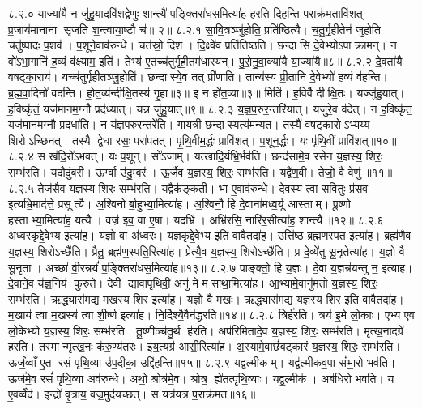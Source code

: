 ८.२.०
या॒ज्या॑यै॒ न जु॑हु॒यादवि॑श॒द्वेणुः॒ शान्त्यै॑ प॒ङ्क्तिरा॑धस॒मित्या॑ह हरति दिहन्ति प॒राक्र॑म॒तावि॑शत् प्र॒जाय॑मानाना सृजति श॒न्त्वाया॒ष्टौ च॑॥ २॥
८.२.१
सा॒वि॒त्रञ्जु॑होति॒ प्रति॑ष्ठित्यै। च॒तु॒र्गृ॒ही॒तेन॑ जुहोति। चतु॑ष्पादः प॒शव॑। प॒शूने॒वाव॑रुन्धे। चत॑स्रो॒ दिश॑। दि॒क्ष्वे॑व प्रति॑तिष्ठति। छन्दासि दे॒वेभ्योऽपाक्रामन्। न वो॑ऽभा॒गानि॑ ह॒व्यं व॑क्ष्याम॒ इति॑। तेभ्य॑ ए॒तच्च॑तुर्गृही॒तम॑धारयन्। पु॒रो॒नु॒वा॒क्या॑यै या॒ज्या॑यै॥८॥
८.२.२
दे॒वता॑यै वषट्का॒राय॑। यच्च॑तुर्गृही॒तञ्जु॒होति॑। छन्दास्ये॒व तत् प्री॑णाति। तान्य॑स्य प्री॒तानि॑ दे॒वेभ्यो॑ ह॒व्यं व॑हन्ति। ब्र॒ह्म॒वा॒दिनो॑ वदन्ति। हो॒त॒व्य॑न्दीक्षि॒तस्य॑ गृ॒हा॥३॥ इ न हो॑त॒व्या॥३॥ मिति॑। ह॒विर्वै दीक्षि॒तः। यज्जु॑हु॒यात्। ह॒विष्कृ॑तं॒ यज॑मानम॒ग्नौ प्रद॑ध्यात्। यन्न जु॑हु॒यात्॥९॥
८.२.३
य॒ज्ञ॒प॒रुर॒न्तरि॑यात्। यजु॑रे॒व व॑देत्। न ह॒विष्कृ॑तं॒ यज॑मानम॒ग्नौ प्र॒दधा॑ति। न य॑ज्ञप॒रुर॒न्तरे॑ति। गा॒य॒त्री छन्दा॒स्यत्य॑मन्यत। तस्यै॑ वषट्का॒रोऽभ्यय्य॒ शिरोऽच्छिनत्। तस्यै द्वे॒धा रसः॒ परा॑पतत्। पृ॒थि॒वीम॒र्द्धः प्रावि॑शत्। प॒शून॒र्द्धः। यः पृ॑थि॒वीं प्रावि॑शत्॥१०॥
८.२.४
स ख॑दि॒रो॑ऽभवत्। यः प॒शून्। सो॑ऽजाम्। यत्खा॑दि॒र्यभ्रि॒र्भव॑ति। छन्द॑सामे॒व रसे॑न य॒ज्ञस्य॒ शिरः॒ सम्भ॑रति। यदौदुं॑बरी। ऊर्ग्वा उ॑दु॒म्बर॑। ऊ॒र्जैव य॒ज्ञस्य॒ शिरः॒ सम्भ॑रति। यद्वै॑ण॒वी। तेजो॒ वै वेणु॑॥११॥
८.२.५
तेज॑सै॒व य॒ज्ञस्य॒ शिरः॒ सम्भ॑रति। यद्वैक॑ङ्कती। भा ए॒वाव॑रुन्धे। दे॒वस्य॑ त्वा सवि॒तुः प्र॑स॒व इत्यभ्रि॒माद॑त्ते॒ प्रसूत्यै। अ॒श्विनोर्बा॒हुभ्या॒मित्या॑ह। अ॒श्विनौ॒ हि दे॒वाना॑मध्व॒र्यू आस्ताम्। पू॒ष्णो हस्ताभ्या॒मित्या॑ह॒ यत्यै। वज्र॑ इव॒ वा ए॒षा। यदभ्रि॑। अभ्रि॑रसि॒ नारि॑र॒सीत्या॑ह॒ शान्त्यै॥१२॥
८.२.६
अ॒ध्व॒र॒कृद्दे॒वेभ्य॒ इत्या॑ह। य॒ज्ञो वा अ॑ध्व॒रः। य॒ज्ञ॒कृद्दे॒वेभ्य॒ इति॒ वावैतदा॑ह। उत्ति॑ष्ठ ब्रह्मणस्पत॒ इत्या॑ह। ब्रह्म॑णै॒व य॒ज्ञस्य॒ शिरोऽच्छै॑ति। प्रैतु॒ ब्रह्म॑ण॒स्पति॒रित्या॑ह। प्रेत्यै॒व य॒ज्ञस्य॒ शिरोऽच्छै॑ति। प्र दे॒व्ये॑तु सू॒नृतेत्या॑ह। य॒ज्ञो वै सू॒नृता। अच्छा॑ वी॒रन्नर्यं॑ प॒ङ्क्तिरा॑धस॒मित्या॑ह॥१३॥
८.२.७
पाङ्क्तो॒ हि य॒ज्ञः। दे॒वा य॒ज्ञन्न॑यन्तु न॒ इत्या॑ह। दे॒वाने॒व य॑ज्ञ॒निय॑ कुरुते। देवी द्यावापृथिवी॒ अनु॑ मे मसाथा॒मित्या॑ह। आ॒भ्यामे॒वानु॑मतो य॒ज्ञस्य॒ शिरः॒ सम्भ॑रति। ऋ॒द्ध्यास॑म॒द्य म॒खस्य॒ शिर॒ इत्या॑ह। य॒ज्ञो वै म॒खः। ऋ॒द्ध्यास॑म॒द्य य॒ज्ञस्य॒ शिर॒ इति वावैतदा॑ह। म॒खाय॑ त्वा म॒खस्य॑ त्वा शी॒र्ष्ण इत्या॑ह। नि॒र्दिश्यै॒वैन॑द्धरति॥१४॥
८.२.८
त्रिर्\mbox{}ह॑रति। त्रय॑ इ॒मे लो॒काः। ए॒भ्य ए॒व लो॒केभ्यो॑ य॒ज्ञस्य॒ शिरः॒ सम्भ॑रति। तू॒ष्णीञ्च॑तु॒र्थ ह॑रति। अप॑रिमितादे॒व य॒ज्ञस्य॒ शिरः॒ सम्भ॑रति। मृ॒त्ख॒नादग्रे॑ हरति। तस्मान्मृत्ख॒नः क॑रु॒ण्य॑तरः। इय॒त्यग्र॑ आसी॒रित्या॑ह। अ॒स्यामे॒वाछं॑बट्कारं य॒ज्ञस्य॒ शिरः॒ सम्भ॑रति। ऊर्जं॒व्वाँ ए॒त रसं॑ पृथि॒व्या उ॑प॒दीका॒ उद्दि॑हन्ति॥१५॥
८.२.९
यद्व॒ल्मीकम्। यद्व॑ल्मीकव॒पा सं॑भा॒रो भव॑ति। ऊर्ज॑मे॒व रसं॑ पृथि॒व्या अव॑रुन्धे। अथो॒ श्रोत्र॑मे॒व। श्रोत्र॒ ह्ये॑तत्पृ॑थि॒व्याः। यद्व॒ल्मीक॑। अब॑धिरो भवति। य ए॒वव्वेँद॑। इन्द्रो॑ वृ॒त्राय॒ वज्र॒मुद॑यच्छत्। स यत्र॑यत्र प॒राक्र॑मत॥१६॥
